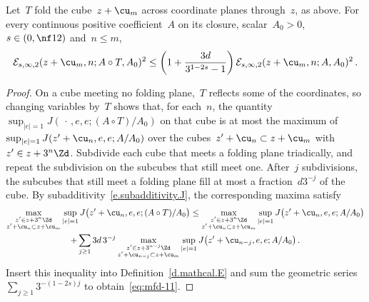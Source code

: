 \documentclass[11pt]{amsart}
\begin{document}
\begin{lemma}
\label{mfd:thm-fold}
Let~$T$ fold the cube~$z+\cu_m$ across coordinate planes through~$z$, as above. For every continuous positive coefficient~$A$ on its closure, scalar~$A_0>0$,~$s\in(0,\nf12)$ and~$n\leq m$,
\begin{equation}
	\mathcal E_{s,\infty,2}(z+\cu_m,n;A\circ T,A_0)^2
	\leq\left(1+\frac{3d}{3^{1-2s}-1}\right)
	\mathcal E_{s,\infty,2}(z+\cu_m,n;A,A_0)^2\,.
	\label{eq:mfd-11}
\end{equation}
\end{lemma}
\begin{proof}
On a cube meeting no folding plane,~$T$ reflects some of the coordinates, so changing variables by~$T$ shows that, for each~$n$, the quantity~$\sup_{|e|=1}J(\,\cdot\,,e,e;(A\circ T)/A_0)$ on that cube is at most the maximum of~$\sup_{|e|=1}J(z'+\cu_n,e,e;A/A_0)$ over the cubes~$z'+\cu_n\subset z+\cu_m$ with~$z'\in z+3^n\Zd$. Subdivide each cube that meets a folding plane triadically, and repeat the subdivision on the subcubes that still meet one. After~$j$ subdivisions, the subcubes that still meet a folding plane fill at most a fraction~$d3^{-j}$ of the cube. By subadditivity~\eqref{e.subadditivity.J}, the corresponding maxima satisfy
\begin{multline*}
	\max_{\substack{z'\in z+3^n\Zd\\z'+\cu_n\subset z+\cu_m}}\sup_{|e|=1}J\bigl(z'+\cu_n,e,e;(A\circ T)/A_0\bigr)
	\leq\max_{\substack{z'\in z+3^n\Zd\\z'+\cu_n\subset z+\cu_m}}\sup_{|e|=1}J\bigl(z'+\cu_n,e,e;A/A_0\bigr)\\
	+\sum_{j\geq1}3d\,3^{-j}\max_{\substack{z'\in z+3^{n-j}\Zd\\z'+\cu_{n-j}\subset z+\cu_m}}\sup_{|e|=1}J\bigl(z'+\cu_{n-j},e,e;A/A_0\bigr)\,.
\end{multline*}
Insert this inequality into Definition~\ref{d.mathcal.E} and sum the geometric series~$\sum_{j\geq1}3^{-(1-2s)j}$ to obtain~\eqref{eq:mfd-11}.
\end{proof}
\end{document}
